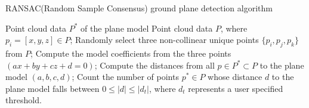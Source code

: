 \documentclass[a4paper, 12pt]{article}
\begin{document}
\begin{sloppypar}



\begin{algorithm}[h]
    \caption{RANSAC(Random Sample Consensus) ground plane detection algorithm  }
    \label{Chap3:Alg1}
    \begin{algorithmic}[1]
        \Ensure Point cloud data $P^*$ of the plane model
        \Require Point cloud data $P$, where $p_i=[x,y,z] \in P$;
        \State Randomly select three non-collinear unique points $\{p_i, p_j, p_k\}$ from $P$;
        \State Compute the model coefficients from the three points $(ax + by + cz + d = 0)$;
        \State Compute the distances from all $p \in P^* \subset P$ to the plane model $(a,b,c,d)$;
        \State Count the number of points $p^* \in P$ whose distance $d$ to the plane model falls between $0 \leq |d| \leq |d_t|$, where $d_t$ represents a user specified threshold.
    \end{algorithmic}
\end{algorithm}



\end{sloppypar}
\end{document}
